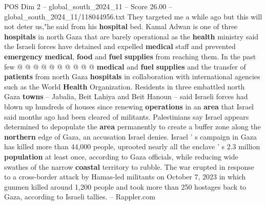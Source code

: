 \begin{textsample}{POS Dim 2 – global\_south\_2024\_11 – Score 26.00 – global\_south\_2024\_11/118044956.txt}
They targeted me a while ago but this will not deter us,"he said from his \textbf{hospital} bed.
Kamal Adwan is one of three \textbf{hospitals} in north Gaza that are barely operational as the \textbf{health} ministry said the Israeli forces have detained and expelled \textbf{medical} staff and prevented \textbf{emergency} \textbf{medical}, \textbf{food} and \textbf{fuel} \textbf{supplies} from reaching them.
In the past few @ @ @ @ @ @ @ @ @ @ \textbf{medical} and \textbf{fuel} \textbf{supplies} and the transfer of \textbf{patients} from north Gaza \textbf{hospitals} in collaboration with international agencies such as the World \textbf{Health} Organization.
Residents in three embattled north Gaza \textbf{towns} -- Jabalia, Beit Lahiya and Beit Hanoun -- said Israeli forces had blown up hundreds of houses since renewing \textbf{operations} in an \textbf{area} that Israel said months ago had been cleared of militants.
Palestinians say Israel appears determined to depopulate the \textbf{area} permanently to create a buffer zone along the \textbf{northern} edge of Gaza, an accusation Israel denies.
Israel ' s campaign in Gaza has killed more than 44,000 people, uprooted nearly all the enclave ' s 2.3 million \textbf{population} at least once, according to Gaza officials, while reducing wide swathes of the narrow \textbf{coastal} territory to rubble.
The war erupted in response to a cross-border attack by Hamas-led militants on October 7, 2023 in which gunmen killed around 1,200 people and took more than 250 hostages back to Gaza, according to Israeli tallies. -- Rappler.com

\end{textsample}
